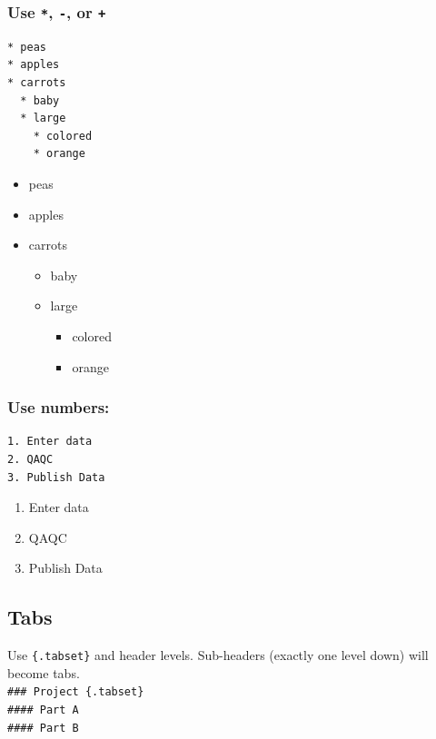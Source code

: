 \documentclass[
]{book}
\providecommand{\tightlist}{%
  \setlength{\itemsep}{0pt}\setlength{\parskip}{0pt}}
\begin{document}
\hypertarget{use---or}{%
\subsubsection{\texorpdfstring{Use \texttt{*}, \texttt{-}, or \texttt{+}}{Use *, -, or +}}\label{use---or}}

\begin{verbatim}
* peas
* apples
* carrots
  * baby
  * large
    * colored
    * orange
\end{verbatim}

\begin{itemize}
\tightlist
\item
  peas
\item
  apples
\item
  carrots

  \begin{itemize}
  \tightlist
  \item
    baby
  \item
    large

    \begin{itemize}
    \tightlist
    \item
      colored
    \item
      orange
    \end{itemize}
  \end{itemize}
\end{itemize}

\hypertarget{use-numbers}{%
\subsubsection{Use numbers:}\label{use-numbers}}

\begin{verbatim}
1. Enter data
2. QAQC
3. Publish Data  
\end{verbatim}

\begin{enumerate}
\def\labelenumi{\arabic{enumi}.}
\tightlist
\item
  Enter data
\item
  QAQC
\item
  Publish Data
\end{enumerate}

\hypertarget{tabs}{%
\subsection{Tabs}\label{tabs}}

Use \texttt{\{.tabset\}} and header levels. Sub-headers (exactly one level down) will become tabs.\\
\texttt{\#\#\#\ Project\ \{.tabset\}}~\\
\texttt{\#\#\#\#\ Part\ A}~\\
\texttt{\#\#\#\#\ Part\ B}
\end{document}
